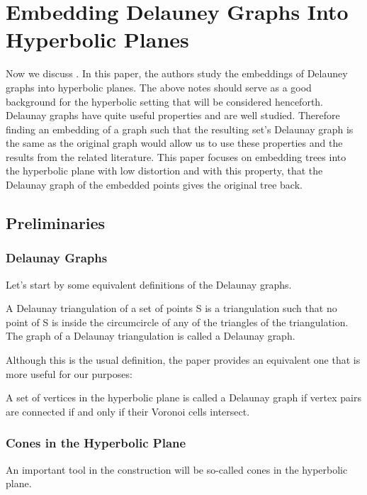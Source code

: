 \section{Embedding Delauney Graphs Into Hyperbolic Planes}

Now we discuss \cite{Sarkar}. 
In this paper, the authors study the embeddings of Delauney graphs into hyperbolic planes. 
The above notes should serve as a good background for the hyperbolic setting that will be considered henceforth.
Delaunay graphs have quite useful properties and are well studied. 
Therefore finding an embedding of a graph such that the resulting set's Delaunay graph is the same as the original graph would allow us to use these properties and the results from the related literature. This paper focuses on embedding trees into the hyperbolic plane with low distortion and with this property, that the Delaunay graph of the embedded points gives the original tree back.
\subsection{Preliminaries}
\subsubsection{Delaunay Graphs}
Let's start by some equivalent definitions of the Delaunay graphs.
\begin{definition}
A Delaunay triangulation of a set of points S is a triangulation such that no point of S is inside the circumcircle of any of the triangles of the triangulation. The graph of a Delaunay triangulation is called a Delaunay graph.
\end{definition}

Although this is the usual definition, the paper provides an equivalent one that is more useful for our purposes:

\begin{definition}
A set of vertices in the hyperbolic plane is called a Delaunay graph if vertex pairs are connected if and only if their Voronoi cells intersect.
\end{definition}

\subsubsection{Cones in the Hyperbolic Plane}
An important tool in the construction will be so-called cones in the hyperbolic plane.

